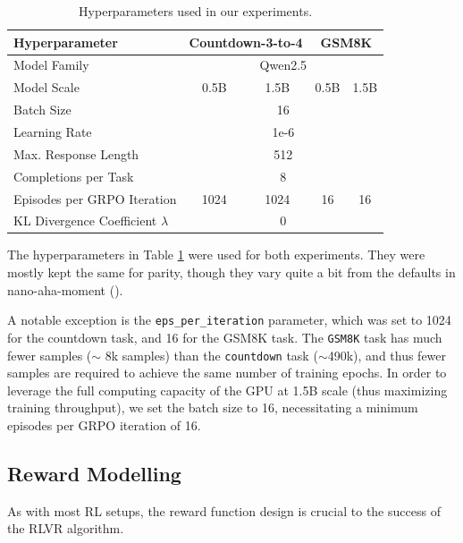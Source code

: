 \documentclass{article} %
\theoremstyle{definition}
\begin{document}
\begin{table}[h]
    \centering
    \begin{tabular}{|l|c|c|c|c|}
        \hline
        \textbf{Hyperparameter} & \multicolumn{2}{c|}{\textbf{Countdown-3-to-4}} & \multicolumn{2}{|c|}{\textbf{GSM8K}} \\
        \hline
        Model Family & \multicolumn{4}{c|}{Qwen2.5} \\
        \hline
        Model Scale & 0.5B & 1.5B & 0.5B & 1.5B \\
        \hline
        Batch Size & \multicolumn{4}{c|}{16} \\
        \hline
        Learning Rate & \multicolumn{4}{c|}{1e-6} \\
        \hline
        Max. Response Length & \multicolumn{4}{c|}{512} \\
        \hline
        Completions per Task & \multicolumn{4}{c|}{8} \\
        \hline
        Episodes per GRPO Iteration & 1024 & 1024 & 16 & 16\\
        \hline
        KL Divergence Coefficient $\lambda$ & \multicolumn{4}{c|}{0} \\
        \hline
    \end{tabular}
    \caption{Hyperparameters used in our experiments.}
    \label{tab:hyperparams}
\end{table}

The hyperparameters in Table \ref{tab:hyperparams} were used for both experiments.
They were mostly kept the same for parity, though they vary quite
a bit from the defaults in nano-aha-moment (\cite{nano-aha-moment}).

A notable exception is the \texttt{eps\_per\_iteration} parameter, which was set to 1024 for the countdown task,
and 16 for the GSM8K task. The \texttt{GSM8K} task has much fewer samples ($\sim$ 8k samples) than the \texttt{countdown} task ($\sim$490k), 
and thus fewer samples are required to achieve the same number of training epochs. In order to 
leverage the full computing capacity of the GPU at 1.5B scale (thus maximizing training throughput), 
we set the batch size to 16, necessitating a minimum episodes per GRPO iteration of 16.

\subsection{Reward Modelling}
As with most RL setups, the reward function design is crucial to the success of the RLVR algorithm.
\end{document}
